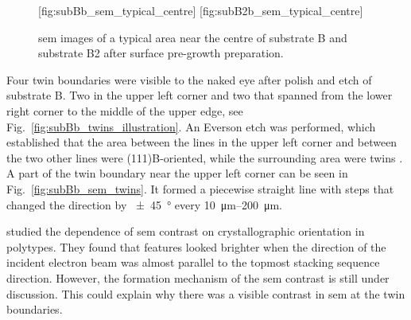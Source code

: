 \begin{figure}[htbp]
    [fig:subBb_sem_typical_centre]
    \hfill
    [fig:subB2b_sem_typical_centre]
    \caption[\Ac{sem} images of typical areas on substrate B and B2 with surface pre-growth preparation.]{\Ac{sem} images of a typical area near the centre of  substrate B and  substrate B2 after surface pre-growth preparation.}\label{fig:subBb_and_subB2b_sem_typical}
\end{figure}

Four twin boundaries were visible to the naked eye after polish and etch of substrate B. Two in the upper left corner and two that spanned from the lower right corner to the middle of the upper edge, see Fig.~\ref{fig:subBb_twins_illustration}. An Everson etch was performed, which established that the area between the lines in the upper left corner and between the two other lines were (111)B-oriented, while the surrounding area were twins \citep{everson1995etch}. A part of the twin boundary near the upper left corner can be seen in Fig.~\ref{fig:subBb_sem_twins}. It formed a piecewise straight line with steps that changed the direction by \SI{\pm 45}{\degree} every \SIrange{10}{200}{\micro\metre}.

\citet{ashida2015crystallographic} studied the dependence of \ac{sem} contrast on crystallographic orientation in  polytypes. They found that features looked brighter when the direction of the incident electron beam was almost parallel to the topmost stacking sequence direction. However, the formation mechanism of the \ac{sem} contrast is still under discussion. This could explain why there was a visible contrast in \ac{sem} at the twin boundaries.

